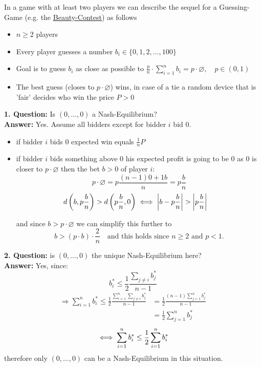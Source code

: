 \begin{example}  \label{Guessing-Game}
	In a game with at least two players we can describe the sequel for a Guessing-Game (e.g. the \hyperref[Beauty-Contest]{Beauty-Contest}) as follows
	\begin{itemize}
		\item $n \geq 2$ players
		\item Every player guesses a number $b_{i} \in \{0, 1, 2, \dotsc, 100 \}$
		\item Goal is to guess $b_{i}$ as close as possible to $\frac{p}{n} \cdot \sum_{i = 1}^{n} b_{i} = p \cdot \varnothing, \quad p \in (0, 1)$
		\item The best guess (closes to $p \cdot \varnothing$) wins, in case of a tie a random device that is 'fair' decides who win the price $P > 0$
	\end{itemize}
	
	
	\textbf{1. Question:} Is $(0, \dotsc, 0)$ a Nash-Equilibrium? \\
	\textbf{Answer:} Yes. Assume all bidders except for bidder $i$ bid $0$.	
		\begin{itemize}
			\item if bidder $i$ bids $0$ expected win equals $\frac{1}{n} P $
			\item if bidder $i$ bids something above $0$ his expected profit is going to be $0$ as $0$ is closer to $p \cdot \varnothing$ then the bet $b > 0$ of player $i$:
			\[ p \cdot \varnothing = p \frac{(n - 1)0 + 1 b}{n} = p \frac{b}{n} \]
			\[
				d \left( b, p \frac{b}{n} \right) > d \left( p \frac{b}{n}, 0 \right)	\iff \left| b - p \frac{b}{n} \right| > \left| p \frac{b}{n} \right| \quad
			\]
			
			and since $b > p \cdot \varnothing$ we can simplify this further to
			\[ b > \left( p \cdot b \right) \cdot \frac{2}{n} \quad \text{and this holds since } n \geq 2 \text{ and } p < 1.\]
		\end{itemize}
		
	
	\textbf{2. Question:} is $(0, \dotsc, 0)$ the unique Nash-Equilibrium here? \\
	\textbf{Answer:} Yes, since:	
	\[ b_{i}^{*} \leq \frac{1}{2} \frac{\sum_{j \neq i} b_{j}^{*}}{n - 1} \]
	\begin{align*}
		\Rightarrow \sum_{i = 1}^{n} b_{i}^{*} \leq \frac{1}{2} \frac{\sum_{i = 1}^{n} \sum_{j \neq i} b_{j}^{*}}{n - 1} & = \frac{1}{2} \frac{(n - 1) \sum_{j = 1}^{n} b_{j}^{*}}{n - 1} \\
		& = \frac{1}{2} \sum_{j = 1}^{n} b_{j}^{*}
	\end{align*} 
	\[ \iff \sum_{i = 1}^{n} b_{i}^{*} \leq \frac{1}{2} \sum_{i = 1}^{n} b_{i}^{*} \]
	therefore only $(0, \dotsc,  0)$ can be a Nash-Equilibrium in this situation. \\



\end{example}
